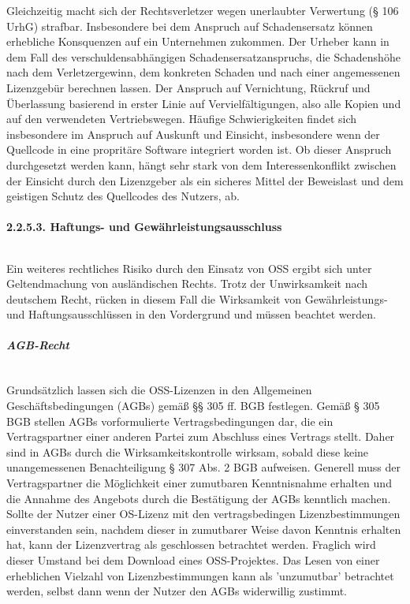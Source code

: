 Gleichzeitig macht sich der Rechtsverletzer wegen unerlaubter Verwertung (§ 106 UrhG) strafbar. Insbesondere bei dem Anspruch auf Schadensersatz können erhebliche Konsquenzen auf ein Unternehmen zukommen. Der Urheber kann in dem Fall des verschuldensabhängigen Schadensersatzanspruchs, die Schadenshöhe nach dem Verletzergewinn, dem konkreten Schaden und nach einer angemessenen Lizenzgebür berechnen lassen. \cite[S. 68]{bitkom_open_2016} Der Anspruch auf Vernichtung, Rückruf und Überlassung basierend in erster Linie auf Vervielfältigungen, also alle Kopien und auf den verwendeten Vertriebswegen. Häufige Schwierigkeiten findet sich insbesondere im Anspruch auf Auskunft und Einsicht, insbesondere wenn der Quellcode in eine propritäre Software integriert worden ist. Ob dieser Anspruch durchgesetzt werden kann, hängt sehr stark von dem Interessenkonflikt zwischen der Einsicht durch den Lizenzgeber als ein sicheres Mittel der Beweislast und dem geistigen Schutz des Quellcodes des Nutzers, ab.\cite[S. 68]{bitkom_open_2016}

\paragraph{2.2.5.3. Haftungs- und Gewährleistungsausschluss}$~$

Ein weiteres rechtliches Risiko durch den Einsatz von OSS ergibt sich unter Geltendmachung von ausländischen Rechts. Trotz der Unwirksamkeit nach deutschem Recht, rücken in diesem Fall die Wirksamkeit von Gewährleistungs- und Haftungsausschlüssen in den Vordergrund und müssen beachtet werden. 

\subparagraph{AGB-Recht}$~$

Grundsätzlich lassen sich die OSS-Lizenzen in den Allgemeinen Geschäftsbedingungen (AGBs) gemäß §§ 305 ff. BGB festlegen. \cite{frohling-bleuer_urheber-_2007} Gemäß § 305 BGB stellen AGBs vorformulierte Vertragsbedingungen dar, die ein Vertragspartner einer anderen Partei zum Abschluss eines Vertrags stellt. Daher sind in AGBs durch die Wirksamkeitskontrolle wirksam, sobald diese keine unangemessenen Benachteiligung § 307 Abs. 2 BGB aufweisen. Generell muss der Vertragspartner die Möglichkeit einer zumutbaren Kenntnisnahme erhalten und die Annahme des Angebots durch die Bestätigung der AGBs kenntlich machen. Sollte der Nutzer einer OS-Lizenz mit den vertragsbedingen Lizenzbestimmungen einverstanden sein, nachdem dieser in zumutbarer Weise davon Kenntnis erhalten hat, kann der Lizenzvertrag als geschlossen betrachtet werden. \cite[S. 23]{renner_open_2006} Fraglich wird dieser Umstand bei dem Download eines OSS-Projektes. Das Lesen von einer erheblichen Vielzahl von Lizenzbestimmungen kann als 'unzumutbar' betrachtet werden, selbst dann wenn der Nutzer den AGBs widerwillig zustimmt.

